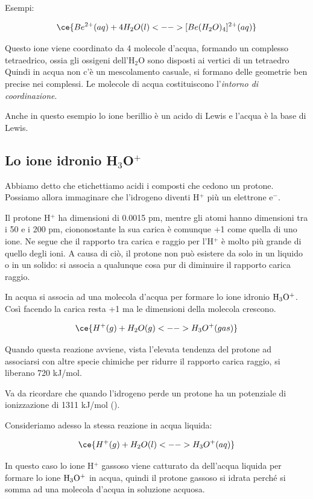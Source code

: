\vspace{0.2cm}Esempi:

$$\ce{Be^{2+}(aq) + 4H_2O(l) <--> [Be(H_2O)_4]^{2+}(aq)}$$

Questo ione viene coordinato da 4 molecole d'acqua, formando un complesso tetraedrico, ossia gli ossigeni dell'H$_2$O sono disposti ai vertici di un tetraedro Quindi in acqua non c'è un mescolamento casuale, si formano delle geometrie ben precise nei complessi. Le molecole di acqua costituiscono l'\textit{intorno di coordinazione}.

Anche in questo esempio lo ione berillio è un acido di Lewis e l'acqua è la base di Lewis.

\subsection{Lo ione idronio H$_3$O$^+$}
Abbiamo detto che etichettiamo acidi i composti che cedono un protone. Possiamo allora immaginare che l'idrogeno diventi H$^+$ più un elettrone e$^-$.

Il protone H$^+$ ha dimensioni di 0.0015 pm, mentre gli atomi hanno dimensioni tra i 50 e i 200 pm, ciononostante la sua carica è comunque +1 come quella di uno ione. Ne segue che il rapporto tra carica e raggio per l'H$^+$ è molto più grande di quello degli ioni. A causa di ciò, il protone non può esistere da solo in un liquido o in un solido: si associa a qualunque cosa pur di diminuire il rapporto carica raggio.

In acqua si associa ad una molecola d'acqua per formare lo ione idronio $\rm H_3O^+$. Così facendo la carica resta +1 ma le dimensioni della molecola crescono.

$$\ce{H^+(g) + H_2O(g) <--> H_3O^+(gas)}$$

Quando questa reazione avviene, vista l'elevata tendenza del protone ad associarsi con altre specie chimiche per ridurre il rapporto carica raggio, si liberano 720 kJ/mol.

Va da ricordare che quando l'idrogeno perde un protone ha un potenziale di ionizzazione di 1311 kJ/mol ().

\vspace{0.2cm}Consideriamo adesso la stessa reazione in acqua liquida:

$$\ce{H^+(g) + H_2O(l) <--> H_3O^+(aq)}$$

In questo caso lo ione H$^+$ gassoso viene catturato da dell'acqua liquida per formare lo ione $\rm H_3O^+$ in acqua, quindi il protone gassoso si idrata perché si somma ad una molecola d'acqua in soluzione acquosa.

